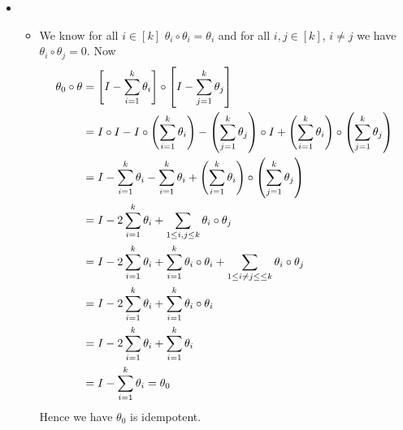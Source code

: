 \documentclass[a4paper, 11pt]{article}
\begin{document}
{\begin{itemize}
\begin{itemize}
	\item 	\textbf{Backward Direction $\boldsymbol{(\Leftarrow)}$:} Suppose $V=\Im\theta\oplus \ker\theta$. For any $v\in V$, $\exs!\ u\in\Im\theta,\ w\in\ker\theta$, such that $v=u+w$. Since $\theta(v)$ is the projection of $v$ onto $\Im\theta$ we have $u=\theta(v)$. Then $v=\theta(v)+w$ where $\theta(w)=0$. Hence we have $$\theta(v)=\theta(\theta(v)+w)=\theta\circ\theta(v)+\theta(w)=\theta\circ\theta(v)$$Hence we have for all $v\in V$, $\theta(v)=\theta\circ\theta(v)$. Therefore $\theta \circ\theta=\theta$ i.e. $\theta$ is idempotent.
	\end{itemize}
Hence we have $\theta $ is idempotent $\iff V=\Im\theta\oplus \ker\theta$ and for all $v\in V$, $\theta(v)$ is just the projection of $v$ onto  $\Im\theta$. 
\item \begin{itemize}
	\item We know for all $i\in[k]$ $\theta_i\circ\theta_i=\theta_i$ and for all $i,j\in[k]$, $i\neq j$ we have $\theta_i\circ\theta_j=0$. Now \begin{align*}
		\theta_0\circ \theta & =  \left[I-\sum_{i=1}^k\theta_i\right]\circ\left[I-\sum_{j=1}^k\theta_j\right]\\
		& = I\circ I -I\circ\left(\sum_{i=1}^k\theta_i\right) - \left(\sum_{j=1}^k\theta_j\right)\circ I +\left(\sum_{i=1}^k\theta_i\right)\circ \left(\sum_{j=1}^k\theta_j\right)\\
		& = I-\sum_{i=1}^k\theta_i-\sum_{i=1}^k\theta_i+\left(\sum_{i=1}^k\theta_i\right)\circ \left(\sum_{j=1}^k\theta_j\right)\\
		& = I-2\sum_{i=1}^k\theta_i+\sum_{1\leq i,j\leq k}\theta_i\circ \theta_j\\
		& =  I-2\sum_{i=1}^k\theta_i+\sum_{i=1}^k\theta_i\circ\theta_i+\sum_{1\leq i\neq j\leq \leq k}\theta_i\circ \theta_j\\
		& = I-2\sum_{i=1}^k\theta_i+\sum_{i=1}^k\theta_i\circ\theta_i\\
		& = I-2\sum_{i=1}^k\theta_i+\sum_{i=1}^k\theta_i\\
		& = I-\sum_{i=1}^k\theta_i=\theta_0
	\end{align*}Hence we have $\theta_0$ is idempotent. 
	

\end{itemize}
\end{itemize}}
\end{document}
